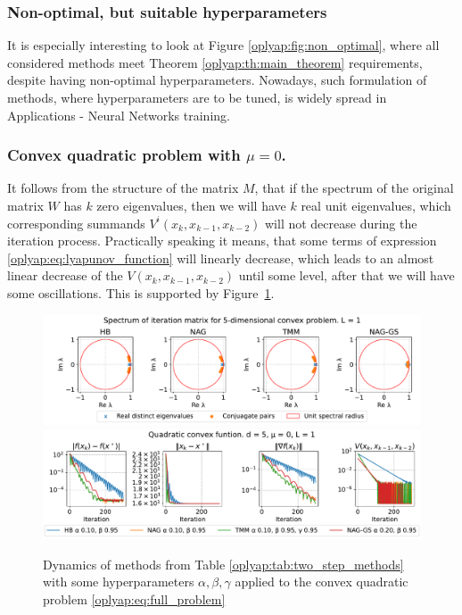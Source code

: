 \documentclass[a4paper,11pt]{article}
\begin{document}
\subsubsection{Non-optimal, but suitable hyperparameters}

It is especially interesting to look at Figure \ref{oplyap:fig:non_optimal}, where all considered methods meet Theorem \ref{oplyap:th:main_theorem} requirements, despite having non-optimal hyperparameters. Nowadays, such formulation of methods, where hyperparameters are to be tuned, is widely spread in Applications - Neural Networks training.

\subsubsection{Convex quadratic problem with $\mu=0$.}

It follows from the structure of the matrix $M$, that if the spectrum of the original matrix $W$ has $k$ zero eigenvalues, then we will have $k$ real unit eigenvalues, which corresponding summands $V^i(x_k, x_{k-1}, x_{k-2})$ will not decrease during the iteration process. Practically speaking it means, that some terms of expression \eqref{oplyap:eq:lyapunov_function} will linearly decrease, which leads to an almost linear decrease of the $V(x_k, x_{k-1}, x_{k-2})$ until some level, after that we will have some oscillations. This is supported by Figure~\ref{oplyap:fig:convex_quad}.

\begin{figure}[h!]
 \centering
 \includegraphics[width=\linewidth]{convex_quad_eigenvalues.pdf}
 \includegraphics[width=\linewidth]{convex_quad.pdf}
 \caption{Dynamics of methods from Table \ref{oplyap:tab:two_step_methods} with some hyperparameters $\alpha, \beta, \gamma$ applied to the convex quadratic problem \eqref{oplyap:eq:full_problem}}
 \label{oplyap:fig:convex_quad}
\end{figure}
\end{document}
